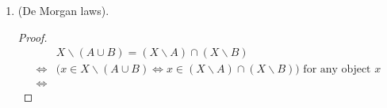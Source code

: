 \begin{enumerate}
\begin{proof}
\begin{align*}
            \\\iff& (x \in A \iff x \in X)
            \\\iff& ( x \in A \text{ or } x \in X \iff x \in X ). \qedhere
        \end{align*}
    \end{proof}
    \begin{proof}
        We shall deduce what is required for $A \cap (X\backslash A) = \emptyset$ to be true.
        \begin{align*}
            & A \cap (X\backslash A) = \emptyset
            \\\iff& \big( x \in A \cap (X\backslash A) \iff x \in \emptyset \big) \text{ for any object $x$}
            \\\iff& \big( x \in A \text{ and } x \in (X\backslash A) \iff x \in \emptyset \big) 
            \\\iff& \big( x \in A \text{ and } (x \in X \text{ and } x \notin A) \iff x \in \emptyset \big)
            \\\iff& \big( x \in X \text{ and } (x \in A \text{ and } x \notin A) \iff x \in \emptyset \big)
            \\\iff& ( x \in X \text{ and } \text{False} \iff \text{False} )
            \\\iff& (\text{False} \iff \text{False}),
        \end{align*}
        which is a true statement.
    \end{proof}
    \item (De Morgan laws).
    \begin{proof}
        \begin{align*}
            & X\backslash (A \cup B) = (X\backslash A) \cap (X\backslash B)
            \\\iff& \big(x \in X\backslash (A \cup B) \iff x \in (X\backslash A) \cap (X\backslash B) \big) \text{ for any object $x$}
            \\\iff& 
        \end{align*}
    \end{proof}
\end{enumerate}